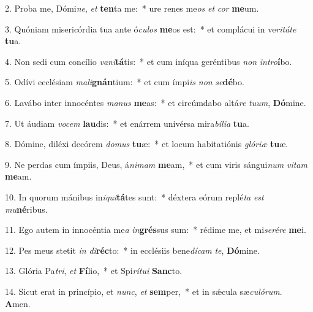 2. Proba me, Dómi\textit{ne}, \textit{et} \textbf{ten}ta me:~*  ure renes me\textit{os} \textit{et} \textit{cor} \textbf{me}um.\

3. Quóniam misericórdia tua ante ó\textit{cu}\textit{los} \textbf{me}os est:~*  et complácui in ve\textit{ri}\textit{tá}\textit{te} \textbf{tu}a.\

4. Non sedi cum concílio \textit{va}\textit{ni}\textbf{tá}tis:~*  et cum iníqua geréntibus \textit{non} \textit{in}\textit{tro}\textbf{í}bo.\

5. Odívi ecclésiam \textit{ma}\textit{li}\textbf{gnán}tium:~*  et cum ímpi\textit{is} \textit{non} \textit{se}\textbf{dé}bo.\

6. Lavábo inter innocéntes \textit{ma}\textit{nus} \textbf{me}as:~*  et circúmdabo altá\textit{re} \textit{tu}\textit{um}, \textbf{Dó}mine.\

7. Ut áudiam \textit{vo}\textit{cem} \textbf{lau}dis:~*  et enárrem univérsa mira\textit{bí}\textit{li}\textit{a} \textbf{tu}a.\

8. Dómine, diléxi decórem \textit{do}\textit{mus} \textbf{tu}æ:~*  et locum habitatiónis \textit{gló}\textit{ri}\textit{æ} \textbf{tu}æ.\

9. Ne perdas cum ímpiis, Deus, á\textit{ni}\textit{mam} \textbf{me}am,~*  et cum viris sángui\textit{num} \textit{vi}\textit{tam} \textbf{me}am.\

10. In quorum mánibus in\textit{i}\textit{qui}\textbf{tá}tes sunt:~*  déxtera eórum replé\textit{ta} \textit{est} \textit{mu}\textbf{né}ribus.\

11. Ego autem in innocéntia me\textit{a} \textit{in}\textbf{grés}sus sum:~*  rédime me, et mi\textit{se}\textit{ré}\textit{re} \textbf{me}i.\

12. Pes meus stetit \textit{in} \textit{di}\textbf{réc}to:~*  in ecclésiis bene\textit{dí}\textit{cam} \textit{te}, \textbf{Dó}mine.\

13. Glória Pa\textit{tri}, \textit{et} \textbf{Fí}lio,~*  et Spi\textit{rí}\textit{tu}\textit{i} \textbf{Sanc}to.\

14. Sicut erat in princípio, et \textit{nunc}, \textit{et} \textbf{sem}per,~*  et in sǽcula sæ\textit{cu}\textit{ló}\textit{rum}. \textbf{A}men.\

